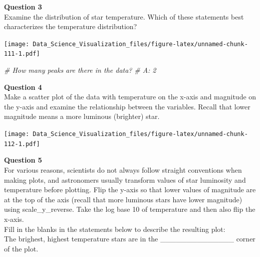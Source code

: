 \documentclass[
]{article}
\newenvironment{Shaded}{\begin{snugshade}}{\end{snugshade}}
\newcommand{\CommentTok}[1]{\textcolor[rgb]{0.56,0.35,0.01}{\textit{#1}}}
\newcommand{\DataTypeTok}[1]{\textcolor[rgb]{0.13,0.29,0.53}{#1}}
\newcommand{\KeywordTok}[1]{\textcolor[rgb]{0.13,0.29,0.53}{\textbf{#1}}}
\newcommand{\NormalTok}[1]{#1}
\newcommand{\OperatorTok}[1]{\textcolor[rgb]{0.81,0.36,0.00}{\textbf{#1}}}
\newcommand{\StringTok}[1]{\textcolor[rgb]{0.31,0.60,0.02}{#1}}
\begin{document}
\textbf{Question 3}\\
Examine the distribution of star temperature. Which of these statements
best characterizes the temperature distribution?

\begin{Shaded}
\end{Shaded}

\texttt{[image: Data\_Science\_Visualization\_files/figure-latex/unnamed-chunk-111-1.pdf]}

\begin{Shaded}
\begin{Highlighting}[]
\CommentTok{# How many peaks are there in the data?}
\CommentTok{# A: 2}
\end{Highlighting}
\end{Shaded}

\textbf{Question 4}\\
Make a scatter plot of the data with temperature on the x-axis and
magnitude on the y-axis and examine the relationship between the
variables. Recall that lower magnitude means a more luminous (brighter)
star.

\begin{Shaded}
\end{Shaded}

\texttt{[image: Data\_Science\_Visualization\_files/figure-latex/unnamed-chunk-112-1.pdf]}

\textbf{Question 5}\\
For various reasons, scientists do not always follow straight
conventions when making plots, and astronomers usually transform values
of star luminosity and temperature before plotting. Flip the y-axis so
that lower values of magnitude are at the top of the axis (recall that
more luminous stars have lower magnitude) using scale\_y\_reverse. Take
the log base 10 of temperature and then also flip the x-axis.\\
Fill in the blanks in the statements below to describe the resulting
plot:\\
The brighest, highest temperature stars are in the
\_\_\_\_\_\_\_\_\_\_\_\_\_\_ corner of the plot.
\end{document}
